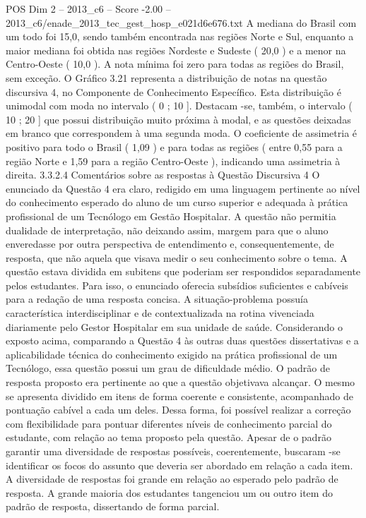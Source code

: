 \begin{textsample}{POS Dim 2 – 2013\_c6 – Score -2.00 – 2013\_c6/enade\_2013\_tec\_gest\_hosp\_e021d6e676.txt}
A mediana do Brasil com um todo foi 15,0, sendo também encontrada nas regiões Norte e Sul, enquanto a maior mediana foi obtida nas regiões Nordeste e Sudeste ( 20,0 ) e a menor na Centro-Oeste ( 10,0 ).
A nota mínima foi zero para todas as regiões do Brasil, sem exceção.
O Gráfico 3.21 representa a distribuição de notas na questão discursiva 4, no Componente de Conhecimento Específico.
Esta distribuição é unimodal com moda no intervalo ( 0 ; 10 ].
Destacam -se, também, o intervalo ( 10 ; 20 ] que possui distribuição muito próxima à modal, e as questões deixadas em branco que correspondem à uma segunda moda.
O coeficiente de assimetria é positivo para todo o Brasil ( 1,09 ) e para todas as regiões ( entre 0,55 para a região Norte e 1,59 para a região Centro-Oeste ), indicando uma assimetria à direita. 3.3.2.4 Comentários sobre as respostas à Questão Discursiva 4 O enunciado da Questão 4 era claro, redigido em uma linguagem pertinente ao nível do conhecimento esperado do aluno de um curso superior e adequada à prática profissional de um Tecnólogo em Gestão Hospitalar.
A questão não permitia dualidade de interpretação, não deixando assim, margem para que o aluno enveredasse por outra perspectiva de entendimento e, consequentemente, de resposta, que não aquela que visava medir o seu conhecimento sobre o tema.
A questão estava dividida em subitens que poderiam ser respondidos separadamente pelos estudantes.
Para isso, o enunciado oferecia subsídios suficientes e cabíveis para a redação de uma resposta concisa.
A situação-problema possuía característica interdisciplinar e de contextualizada na rotina vivenciada diariamente pelo Gestor Hospitalar em sua unidade de saúde.
Considerando o exposto acima, comparando a Questão 4 às outras duas questões dissertativas e a aplicabilidade técnica do conhecimento exigido na prática profissional de um Tecnólogo, essa questão possui um grau de dificuldade médio.
O padrão de resposta proposto era pertinente ao que a questão objetivava alcançar.
O mesmo se apresenta dividido em itens de forma coerente e consistente, acompanhado de pontuação cabível a cada um deles.
Dessa forma, foi possível realizar a correção com flexibilidade para pontuar diferentes níveis de conhecimento parcial do estudante, com relação ao tema proposto pela questão.
Apesar de o padrão garantir uma diversidade de respostas possíveis, coerentemente, buscaram -se identificar os focos do assunto que deveria ser abordado em relação a cada item.
A diversidade de respostas foi grande em relação ao esperado pelo padrão de resposta.
A grande maioria dos estudantes tangenciou um ou outro item do padrão de resposta, dissertando de forma parcial.

\end{textsample}
